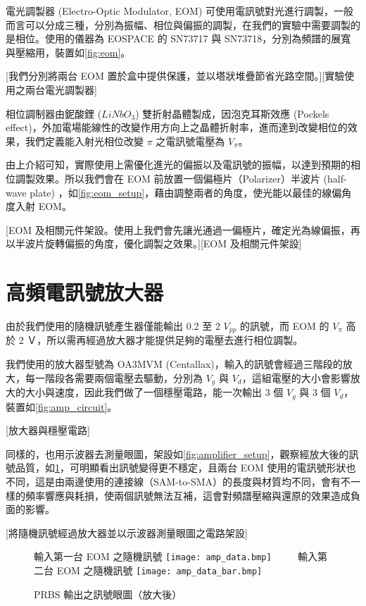 \documentclass[class=NCU_thesis, crop=false]{standalone}
\begin{document}
電光調製器 (Electro-Optic Modulator, EOM) 可使用電訊號對光進行調製，一般而言可以分成三種，分別為振幅、相位與偏振的調製，在我們的實驗中需要調製的是相位。使用的儀器為 EOSPACE 的 SN73717 與 SN73718，分別為頻譜的展寬與壓縮用，裝置如\cref{fig:eom}。

[我們分別將兩台 EOM 置於盒中提供保護，並以塔狀堆疊節省光路空間。][實驗使用之兩台電光調製器]

相位調制器由鈮酸鋰 ($LiNbO_{3}$) 雙折射晶體製成，因泡克耳斯效應 (Pockels effect)，外加電場能線性的改變作用方向上之晶體折射率，進而達到改變相位的效果，我們定義能入射光相位改變 $\pi$ 之電訊號電壓為 $V_{\pi}$。

由上介紹可知，實際使用上需優化進光的偏振以及電訊號的振幅，以達到預期的相位調製效果。所以我們會在 EOM 前放置一個偏極片（Polarizer）半波片 (half-wave plate) ，如\cref{fig:eom_setup}，藉由調整兩者的角度，使光能以最佳的線偏角度入射 EOM。

[EOM 及相關元件架設。使用上我們會先讓光通過一偏極片，確定光為線偏振，再以半波片旋轉偏振的角度，優化調製之效果。][EOM 及相關元件架設]

\section{高頻電訊號放大器}

由於我們使用的隨機訊號產生器僅能輸出 0.2 至 2 $V_{pp}$ 的訊號，而 EOM 的 $V_{\pi}$ 高於 2 Ｖ，所以需再經過放大器才能提供足夠的電壓去進行相位調製。

我們使用的放大器型號為 OA3MVM (Centallax)，輸入的訊號會經過三階段的放大，每一階段各需要兩個電壓去驅動，分別為 $V_{g}$ 與 $V_{d}$，這組電壓的大小會影響放大的大小與速度，因此我們做了一個穩壓電路，能一次輸出 3 個 $V_{g}$ 與 3 個 $V_{d}$，裝置如\cref{fig:amp_circuit}。

[放大器與穩壓電路]

同樣的，也用示波器去測量眼圖，架設如\cref{fig:amplifier_setup}，觀察經放大後的訊號品質，如\cref{fig:amp_prbs_eye}，可明顯看出訊號變得更不穩定，且兩台 EOM 使用的電訊號形狀也不同，這是由兩邊使用的連接線（SAM-to-SMA）的長度與材質均不同，會有不一樣的頻率響應與耗損，使兩個訊號無法互補，這會對頻譜壓縮與還原的效果造成負面的影響。

[將隨機訊號經過放大器並以示波器測量眼圖之電路架設]

\begin{figure}[!hbt]
    \centering
    \subcaptionbox
        {輸入第一台 EOM 之隨機訊號
        \label{fig:subfig_fig1}}
        {\texttt{[image: amp\_data.bmp]}}
    ~~~~
    \subcaptionbox
        {輸入第二台 EOM 之隨機訊號
        \label{fig:subfig_fig2}}
        {\texttt{[image: amp\_data\_bar.bmp]}}
    \caption{PRBS 輸出之訊號眼圖（放大後）}
    \label{fig:amp_prbs_eye}
\end{figure}
\end{document}
